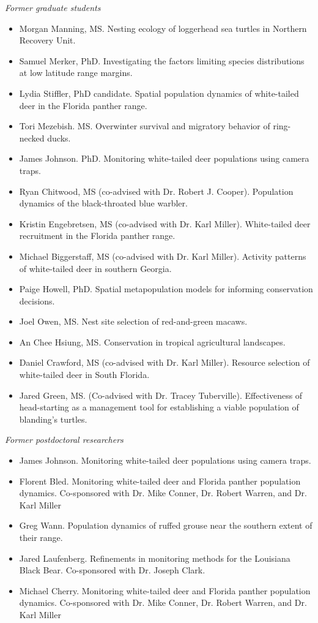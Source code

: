 {\it Former graduate students}
\begin{itemize}
  \item Morgan Manning, MS. Nesting ecology of loggerhead
    sea turtles in Northern Recovery Unit.
  \item Samuel Merker, PhD. Investigating the factors
    limiting species distributions at low latitude range margins. 
  \item Lydia Stiffler, PhD candidate. Spatial population dynamics of
    white-tailed deer in the Florida panther range.
  \item Tori Mezebish. MS. Overwinter survival and migratory
    behavior of ring-necked ducks.
   \item James Johnson. PhD. Monitoring white-tailed deer
     populations using camera traps. 
  \item Ryan Chitwood, MS (co-advised with Dr. Robert
    J. Cooper). Population dynamics of the black-throated blue warbler. 
  \item Kristin Engebretsen, MS (co-advised with Dr. Karl
    Miller). White-tailed deer recruitment in the Florida panther
    range.
  \item Michael Biggerstaff, MS (co-advised with Dr. Karl
    Miller). Activity patterns of white-tailed deer in southern Georgia. 
  \item Paige Howell, PhD. Spatial metapopulation models for 
    informing conservation decisions.
  \item Joel Owen, MS. Nest site selection of red-and-green macaws. 
  \item An Chee Hsiung, MS. Conservation in tropical agricultural landscapes.
  \item Daniel Crawford, MS (co-advised with Dr. Karl
    Miller). Resource selection of white-tailed deer in South
    Florida.
  \item Jared Green, MS. (Co-advised with Dr. Tracey
    Tuberville). Effectiveness of head-starting as a management tool
    for establishing a viable population of blanding's turtles. 
\end{itemize}




{\it Former postdoctoral researchers}
\begin{itemize}
   \item James Johnson. Monitoring white-tailed deer
     populations using camera traps. 
   \item Florent Bled. Monitoring white-tailed deer and Florida panther
     population dynamics. Co-sponsored with Dr. Mike Conner,
     Dr. Robert Warren, and Dr. Karl Miller
   \item Greg Wann. Population dynamics of ruffed grouse near the
     southern extent of their range.  
   \item Jared Laufenberg. Refinements in
     monitoring methods for the Louisiana Black Bear. Co-sponsored
     with Dr. Joseph Clark.  
   \item Michael Cherry. Monitoring white-tailed deer and Florida panther
     population dynamics. Co-sponsored with Dr. Mike Conner,
     Dr. Robert Warren, and Dr. Karl Miller
\end{itemize}

